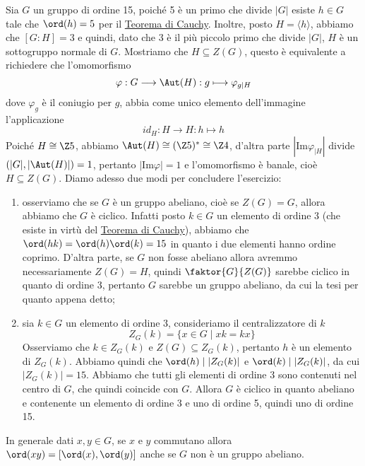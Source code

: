 \documentclass[11pt]{scrartcl}
\begin{document}
\begin{soln}
    Sia $G$ un gruppo di ordine 15, poiché 5 è un primo che divide $|G|$
    esiste $h \in G$ tale che $\ord(h) = 5$ per il \hyperref[teorema1.44]{Teorema di Cauchy}.
    Inoltre, posto $H = \langle h\rangle$, abbiamo che $[G:H] = 3$ e quindi,
    dato che 3 è il più piccolo primo che divide $|G|$, $H$ è un sottogruppo 
    normale di $G$. Mostriamo che $H \subseteq Z(G)$, questo è equivalente a 
    richiedere che l'omomorfismo \[
        \varphi: G\longrightarrow \Aut(H) :g\longmapsto \varphi_{g\mid H}
    \]
    dove $\varphi_g$ è il coniugio per $g$, abbia come unico elemento dell'immagine
    l'applicazione
    \[
        id_H:H\longrightarrow H: h \longmapsto h
    \]
    Poiché $H \cong \Z5$, abbiamo $\Aut(H)\cong (\Z5)^* \cong \Z4$, d'altra 
    parte $|\mathrm{Im}\varphi_{\mid H}|$ divide $(|G|, |\Aut(H)|) = 1$, pertanto
    $|\mathrm{Im}\varphi| = 1$ e l'omomorfismo è banale, cioè $H \subseteq Z(G)$.
    Diamo adesso due modi per concludere l'esercizio:
    \begin{enumerate}[(1)]
        \item osserviamo che se $G$ è un gruppo abeliano, cioè se $Z(G) = G$,
        allora abbiamo che $G$ è ciclico. Infatti posto $k \in G$ un elemento di 
        ordine 3 (che esiste in virtù del \hyperref[teorema1.44]{Teorema di Cauchy}),
        abbiamo che $\ord(hk) = \ord(h)\ord(k) = 15$ in quanto i due elementi hanno
        ordine coprimo. D'altra parte, se $G$ non fosse abeliano allora avremmo 
        necessariamente $Z(G) = H$, quindi $\faktor{G}{Z(G)}$ sarebbe ciclico 
        in quanto di ordine 3, pertanto $G$ sarebbe un gruppo abeliano, da cui 
        la tesi per quanto appena detto;
        \item sia $k \in G$ un elemento di ordine 3, consideriamo il centralizzatore
        di $k$
        \[
            Z_G(k) = \{x \in G\mid xk = kx\}
        \]Osserviamo che $k \in Z_G(k)$ e $Z(G) \subseteq Z_G(k)$, pertanto $h$ è un elemento 
        di $Z_G(k)$. Abbiamo quindi che $\ord(h)\mid |Z_G(k)|$ e $\ord(k)\mid |Z_G(k)|$, 
        da cui $|Z_G(k)| = 15$. Abbiamo che tutti gli elementi di ordine 3
        sono contenuti nel centro di $G$, che quindi coincide con $G$. Allora $G$
        è ciclico in quanto abeliano e contenente un elemento di ordine 3 e uno
        di ordine 5, quindi uno di ordine 15.
    \end{enumerate}
\end{soln}

\begin{remark}
    In generale dati $x, y\in G$, se $x$ e $y$ commutano allora 
    $\ord(xy) = [\ord(x), \ord(y)]$ anche se $G$ non è un gruppo abeliano.
\end{remark}
\end{document}
